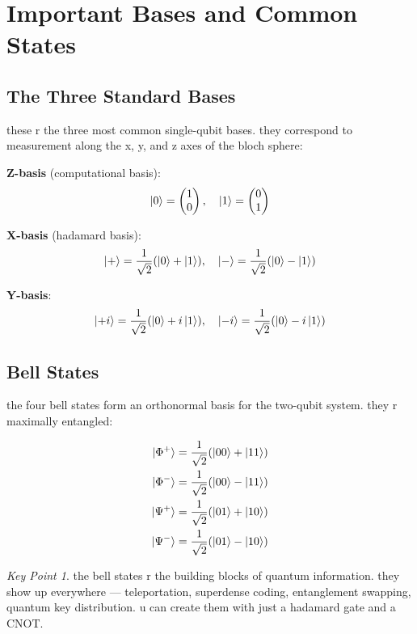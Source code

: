 \documentclass[11pt,a4paper]{article}
\theoremstyle{definition}
\theoremstyle{remark}
\newtheorem*{keypoint}{Key Point}
\begin{document}
\section{Important Bases and Common States}

\subsection{The Three Standard Bases}

these r the three most common single-qubit bases. they correspond to measurement along the x, y, and z axes of the bloch sphere:

\textbf{Z-basis} (computational basis):
\[
\ket{0} = \begin{pmatrix} 1 \\ 0 \end{pmatrix}, \quad \ket{1} = \begin{pmatrix} 0 \\ 1 \end{pmatrix}
\]

\textbf{X-basis} (hadamard basis):
\[
\ket{+} = \frac{1}{\sqrt{2}}(\ket{0} + \ket{1}), \quad \ket{-} = \frac{1}{\sqrt{2}}(\ket{0} - \ket{1})
\]

\textbf{Y-basis}:
\[
\ket{+i} = \frac{1}{\sqrt{2}}(\ket{0} + i\ket{1}), \quad \ket{-i} = \frac{1}{\sqrt{2}}(\ket{0} - i\ket{1})
\]

\subsection{Bell States}

the four bell states form an orthonormal basis for the two-qubit system. they r maximally entangled:

\begin{align}
\ket{\Phi^+} &= \frac{1}{\sqrt{2}}(\ket{00} + \ket{11}) \\
\ket{\Phi^-} &= \frac{1}{\sqrt{2}}(\ket{00} - \ket{11}) \\
\ket{\Psi^+} &= \frac{1}{\sqrt{2}}(\ket{01} + \ket{10}) \\
\ket{\Psi^-} &= \frac{1}{\sqrt{2}}(\ket{01} - \ket{10})
\end{align}

\begin{keypoint}
the bell states r the building blocks of quantum information. they show up everywhere --- teleportation, superdense coding, entanglement swapping, quantum key distribution. u can create them with just a hadamard gate and a CNOT.
\end{keypoint}
\end{document}
